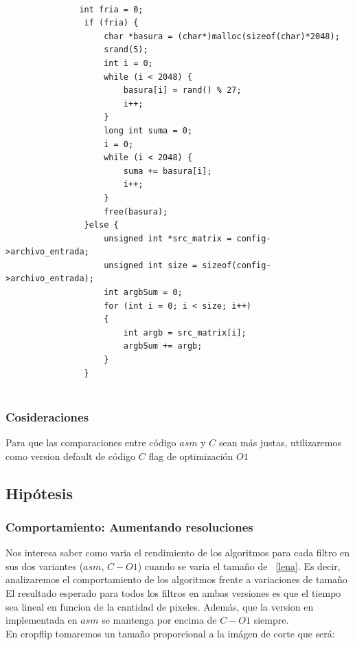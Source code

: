 \begin{codesnippet}
\begin{verbatim}
                
               int fria = 0;
				if (fria) {
					char *basura = (char*)malloc(sizeof(char)*2048);
					srand(5);
					int i = 0;
					while (i < 2048) {
						basura[i] = rand() % 27;            
						i++;                
					}
					long int suma = 0;
					i = 0;                
					while (i < 2048) {
						suma += basura[i];   
						i++;         
					}
					free(basura);
				}else {
					unsigned int *src_matrix = config->archivo_entrada;
					unsigned int size = sizeof(config->archivo_entrada);
					int argbSum = 0;
					for (int i = 0; i < size; i++)
					{
						int argb = src_matrix[i];
						argbSum += argb;
					}
				}
                
\end{verbatim}
\end{codesnippet}

\pagebreak

\subsubsection{Cosideraciones}

Para que las comparaciones entre código $asm$ y $C$ sean más justas, utilizaremos como version default de código $C$ flag de optimización $O1$

\subsection{Hipótesis}


\subsubsection{Comportamiento: Aumentando resoluciones}

Nos interesa saber como varia el rendimiento de los algoritmos para cada filtro en sus dos variantes ($asm$, $C-O1$) cuando se varia el tamaño de ~\ref{lena}. Es decir, analizaremos el comportamiento de los algoritmos frente a variaciones de tamaño\\

El resultado esperado para todos los filtros en ambas versiones es que el tiempo sea lineal en funcion de la cantidad de pixeles.
Además, que la version en implementada en $asm$ se mantenga por encima de $C-O1$ siempre. \\ 
En cropflip tomaremos un tamaño proporcional a la imágen de corte que será: \\

